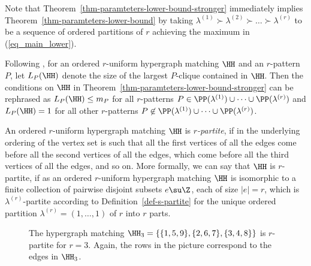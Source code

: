 Note that Theorem~\ref{thm-paramteters-lower-bound-stronger} immediately implies Theorem~\ref{thm-paramteters-lower-bound} by taking $\lambda^{(1)} \succ \lambda^{(2)} \succ \ldots \succ \lambda^{(r)}$ to be a sequence of ordered partitions of $r$ achieving the maximum in (\ref{eq_main_lower}).

Following \cite{AJKS}, for an ordered $r$-uniform hypergraph matching $\HH$ and an $r$-pattern $P$, let $L_P(\HH)$ denote the size of the largest $P$-clique contained in $\HH$. Then the conditions on $\HH$ in Theorem~\ref{thm-paramteters-lower-bound-stronger} can be rephrased as $L_P(\HH)\le m_P$ for all $r$-patterns $P\in \PP(\lambda^{(1)})\cup\dots\cup \PP(\lambda^{(r)})$ and $L_P(\HH)=1$ for all other $r$-patterns $P\not\in \PP(\lambda^{(1)})\cup\dots\cup \PP(\lambda^{(r)})$.

An ordered $r$-uniform hypergraph matching $\HH$ is \emph{$r$-partite}, if in the underlying ordering of the vertex set is such that all the first vertices of all the edges come before all the second vertices of all the edges, which come before all the third vertices of all the edges, and so on. More formally, we can say that $\HH$ is $r$-partite, if as an ordered $r$-uniform hypergraph matching $\HH$ is isomorphic to a finite collection of pairwise disjoint subsets $e\su \Z$, each of size $|e|=r$, which is $\lambda^{(r)}$-partite according to Definition~\ref{def-s-partite} for the unique ordered partition $\lambda^{(r)}=(1,\dots,1)$ of $r$ into $r$ parts.

\begin{figure}
    \centering
    \caption{The hypergraph matching $\HH_3 = \{ \{1,5,9\}, \{2,6,7\},\{3, 4,8\} \}$ is $r$-partite for $r=3$. Again, the rows in the picture correspond to the edges in $\HH_3$.}
    \label{fig:figure-example-r-partite}
\end{figure}

